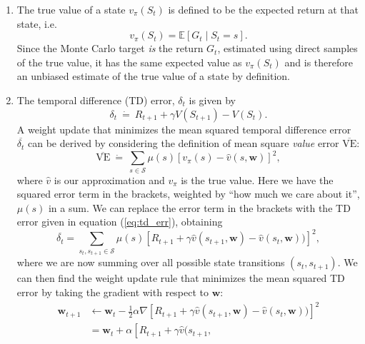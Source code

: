 \documentclass{article}
\begin{document}
\begin{enumerate}
	\item The true value of a state $v_\pi(S_t)$ is defined to be the expected return at that state,
	      i.e.
	      \begin{equation}
		      v_\pi(S_t) = \mathbb{E}\left[ G_t \mid S_t = s \right].
	      \end{equation}
	      Since the Monte Carlo target \textit{is} the return $G_t$, estimated using direct samples of
	      the true value, it has the same expected value as $v_\pi(S_t)$ and is therefore an unbiased
	      estimate of the true value of a state by definition.
	\item The temporal difference (TD) error, $\delta_t$ is given by
	      \begin{equation}
		      \delta_t ~\dot{=}~ R_{t+1} + \gamma V(S_{t+1}) - V(S_t).\label{eq:td_err}
	      \end{equation}
	      A weight update that minimizes the mean squared temporal difference error
	      $\overline{\delta_t}$ can be derived by considering the definition of mean square
	      \textit{value} error $\overline{\text{VE}}$:
	      \begin{equation}
		      \overline{\text{VE}} ~ \dot{=} ~ \sum_{s \in \mathcal{S}} \mu(s) \left[v_\pi(s)
			      - \hat{v}(s, \mathbf{w})\right]^2,
	      \end{equation}
	      where $\hat{v}$ is our approximation and $v_\pi$ is the true value. Here we have the squared
	      error term in the brackets, weighted by ``how much we care about it'', $\mu(s)$ in a sum. We
	      can replace the error term in the brackets with the TD error given in equation
	      (\ref{eq:td_err}), obtaining
	      \begin{equation}
		      \overline{\delta_t} = \sum_{s_t, s_{t+1} \in \mathcal{S}} \mu(s) \left[R_{t+1} + \gamma
			      \hat{v}(s_{t+1}, \mathbf{w}) - \hat{v}(s_t, \mathbf{w}))\right]^2,
	      \end{equation}
	      where we are now summing over all possible state transitions $(s_t, s_{t+1})$.  We can then
	      find the weight update rule that minimizes the mean squared TD error by taking the gradient
	      with respect to $\mathbf{w}$:
	      \begin{align*}
		      \mathbf{w}_{t+1} & \leftarrow \mathbf{w}_t - \frac{1}{2} \alpha \nabla\left[R_{t+1}
		      + \gamma \hat{v}(s_{t+1}, \mathbf{w}) - \hat{v}(s_t, \mathbf{w}))\right]^2          \\
		                       & = \mathbf{w}_t + \alpha \left[R_{t+1} + \gamma \hat{v}(s_{t+1},

\end{align*}
\end{enumerate}
\end{document}
